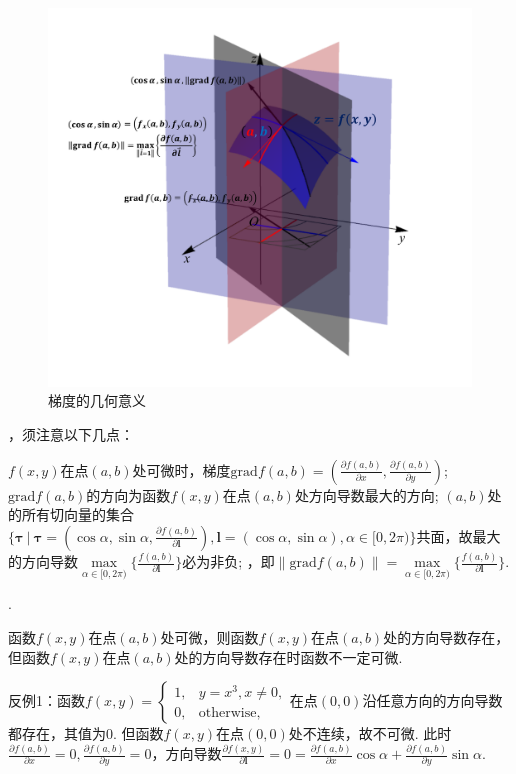 \documentclass[12pt,UTF8]{ctexart}
\newcommand\Set[2]{\{#1\ \vert\ #2 \}}
\begin{document}
\begin{enumerate}
\begin{figure}[H]
\begin{center}
\includegraphics[height=0.6\textheight,angle=0]{Figures20190609/gradient.pdf}
\end{center}
\caption{梯度的几何意义}
\end{figure}
，须注意以下几点：
\begin{enumerate}
$f(x,y)$在点$(a,b)$处可微时，梯度$\text{grad}f(a,b)=(\frac{\partial f(a,b)}{\partial x},\frac{\partial f(a,b)}{\partial y})$;
$\text{grad}f(a,b)$的方向为函数$f(x,y)$在点$(a,b)$处方向导数最大的方向;
$(a,b)$处的所有切向量的集合$\Set{\bm\tau}{\bm\tau=(\cos\alpha,\sin\alpha,\frac{\partial f(a,b)}{\partial\bm l}),\bm l=(\cos\alpha,\sin\alpha),\alpha\in[0,2\pi)}$共面，故最大的方向导数$\max\limits_{\alpha\in[0,2\pi)}\{\frac{f(a,b)}{\partial\bm l}\}$必为非负;
，即$\|\text{grad}f(a,b)\|=\max\limits_{\alpha\in[0,2\pi)}\{\frac{f(a,b)}{\partial\bm l}\}$.
\end{enumerate}
.

函数$f(x,y)$在点$(a,b)$处可微，则函数$f(x,y)$在点$(a,b)$处的方向导数存在，但函数$f(x,y)$在点$(a,b)$处的方向导数存在时函数不一定可微.

反例1：函数$f(x,y)=\begin{cases}
1,&y=x^3,x\neq0,\\
0,&\text{otherwise},
\end{cases}$在点$(0,0)$沿任意方向的方向导数都存在，其值为$0$. 但函数$f(x,y)$在点$(0,0)$处不连续，故不可微. 此时$\frac{\partial f(a,b)}{\partial x}=0,\frac{\partial f(a,b)}{\partial y}=0$，方向导数$\frac{\partial f(x,y)}{\partial\bm l}=0=\frac{\partial f(a,b)}{\partial x}\cos\alpha+\frac{\partial f(a,b)}{\partial y}\sin\alpha$.


\end{enumerate}
\end{document}
